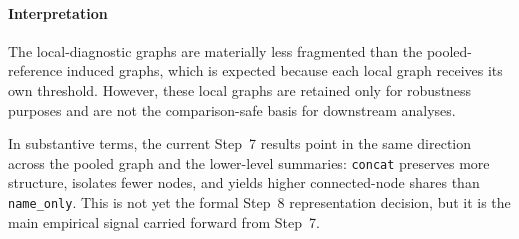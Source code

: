 \begin{table}[htbp]
\centering
\small
\setlength{\tabcolsep}{4pt}
\caption{Local-diagnostic summaries by unit type}
\end{table}

\paragraph{Interpretation}
The local-diagnostic graphs are materially less fragmented than the pooled-reference induced graphs, which is expected because each local graph receives its own threshold. However, these local graphs are retained only for robustness purposes and are not the comparison-safe basis for downstream analyses.

In substantive terms, the current Step~7 results point in the same direction across the pooled graph and the lower-level summaries: \texttt{concat} preserves more structure, isolates fewer nodes, and yields higher connected-node shares than \texttt{name\_only}. This is not yet the formal Step~8 representation decision, but it is the main empirical signal carried forward from Step~7.

